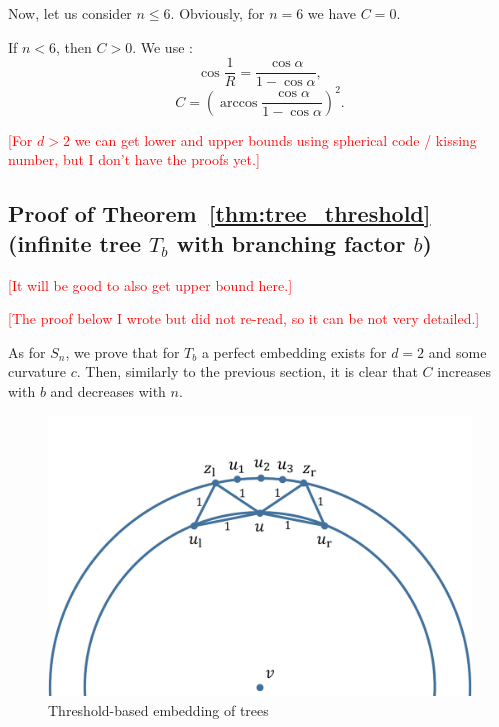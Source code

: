 \documentclass{article} %
\begin{document}
Now, let us consider $n \le 6$. Obviously, for $n = 6$ we have $C = 0$.

If $n < 6$, then $C > 0$. We use :
\[
\cos{\frac{1}{R}} = \frac{\cos \alpha}{1 - \cos \alpha},
\]
\[
C = \left(\arccos \frac{\cos \alpha}{1 - \cos \alpha}\right)^2.
\]

\textcolor{red}{[For $d> 2$ we can get lower and upper bounds using spherical code / kissing number, but I don't have the proofs yet.]} 



\subsection{Proof of Theorem~\ref{thm:tree_threshold} (infinite tree $T_b$ with branching factor $b$)}

\textcolor{red}{[It will be good to also get upper bound here.]}

\textcolor{red}{[The proof below I wrote but did not re-read, so it can be not very detailed.]}

As for $S_n$, we prove that for $T_b$ a perfect embedding exists for $d = 2$ and some curvature $c$. Then, similarly to the previous section, it is clear that $C$ increases with $b$ and decreases with $n$.


\begin{figure}
    \centering
    \includegraphics[width = 0.5 \textwidth]{trees.pdf}
    \caption{Threshold-based embedding of trees}
    \label{fig:trees}
\end{figure}
\end{document}
